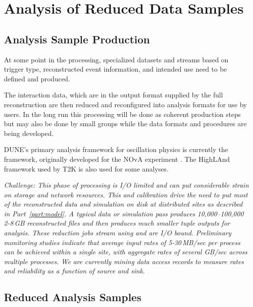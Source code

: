 \documentclass[../main-v1.tex]{subfiles}
\begin{document}
\section{Analysis of Reduced Data Samples}

\subsection{Analysis Sample Production}
At some point in the processing, specialized datasets and streams based on trigger type, reconstructed event information, and intended use need to  be defined and produced.

The interaction data, which are in the output format supplied by the full reconstruction are then reduced and reconfigured into analysis formats for use by users. 
In the long run this processing will be done as coherent production steps but may also be done by small groups while the data formats and procedures are being developed.

DUNE's primary analysis framework for oscillation physics is currently the  framework, originally developed for the NOvA experiment \cite{Backhouse:2015wlj,  bib:cafana}. The HighLAnd framework used by T2K is also used for some analyses. 





{\it Challenge:  This phase of processing is I/O limited and can put considerable strain on storage and network resources.  This and calibration drive the need to put most of the reconstructed data and simulation on disk at distributed sites as described in Part~\ref{part:model}.
A typical  data or simulation pass produces  10,000--100,000 2-8\,GB reconstructed files and  then produces much smaller tuple outputs for analysis.  These reduction jobs stream using  and are I/O bound. Preliminary monitoring studies indicate that average input rates of 5-30\,MB/sec per process can be achieved within a single site, with aggregate rates of several GB/sec across multiple processes. We are currently mining data access records to measure rates and reliability as a function of source and sink. }



\subsection{Reduced Analysis Samples}
\end{document}
